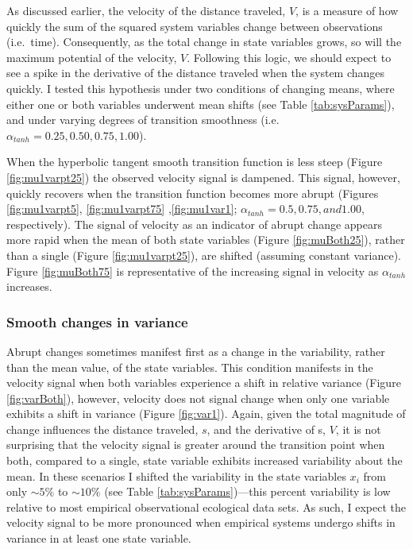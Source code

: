 \documentclass[12pt,twoside,openany]{reedthesis}
\begin{document}
As discussed earlier, the velocity of the distance traveled, \(V\), is a measure of how quickly the sum of the squared system variables change between observations (i.e.~time). Consequently, as the total change in state variables grows, so will the maximum potential of the velocity, \(V\). Following this logic, we should expect to see a spike in the derivative of the distance traveled when the system changes quickly. I tested this hypothesis under two conditions of changing means, where either one or both variables underwent mean shifts (see Table \ref{tab:sysParams}), and under varying degrees of transition smoothness (i.e.~\(\alpha_{tanh}={0.25, 0.50, 0.75, 1.00}\)).

When the hyperbolic tangent smooth transition function is less steep (Figure \ref{fig:mu1varpt25}) the observed velocity signal is dampened. This signal, however, quickly recovers when the transition function becomes more abrupt (Figures \ref{fig:mu1varpt5}, \ref{fig:mu1varpt75} ,\ref{fig:mu1var1}; \(\alpha_{tanh}=0.5, 0.75, and 1.00\), respectively). The signal of velocity as an indicator of abrupt change appears more rapid when the mean of both state variables (Figure \ref{fig:muBoth25}), rather than a single (Figure \ref{fig:mu1varpt25}), are shifted (assuming constant variance). Figure \ref{fig:muBoth75} is representative of the increasing signal in velocity as \(\alpha_{tanh}\) increases.

\hypertarget{smooth-changes-in-variance}{%
\subsubsection{Smooth changes in variance}\label{smooth-changes-in-variance}}

Abrupt changes sometimes manifest first as a change in the variability, rather than the mean value, of the state variables. This condition manifests in the velocity signal when both variables experience a shift in relative variance (Figure \ref{fig:varBoth}), however, velocity does not signal change when only one variable exhibits a shift in variance (Figure \ref{fig:var1}). Again, given the total magnitude of change influences the distance traveled, \(s\), and the derivative of s, \(V\), it is not surprising that the velocity signal is greater around the transition point when both, compared to a single, state variable exhibits increased variability about the mean. In these scenarios I shifted the variability in the state variables \(x_i\) from only \(\sim 5\%\) to \(\sim10\%\) (see Table \ref{tab:sysParams})---this percent variability is low relative to most empirical observational ecological data sets. As such, I expect the velocity signal to be more pronounced when empirical systems undergo shifts in variance in at least one state variable.
\end{document}
